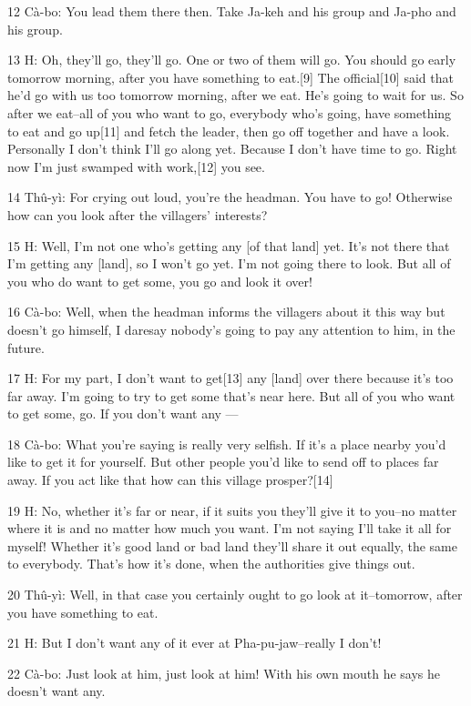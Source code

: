 {12 Cà-bo: You lead them there then. Take Ja-keh and his group and Ja-pho
and his group.}

{13 H: Oh, they'll go, they'll go. One or two of them will go. You should
go early tomorrow morning, after you have something to eat.[9] The official[10]
said that he'd go with us too tomorrow morning, after we eat. He's going to wait
for us. So after we eat--all of you who want to go, everybody who's going, have
something to eat and go up[11] and fetch the leader, then go off together and have
a look. Personally I don't think I'll go along yet. Because I don't have time to
go. Right now I'm just swamped with work,[12] you see.}

{14 Thû-yì: For crying out loud, you're the headman. You have to go! Otherwise
how can you look after the villagers' interests?}

{15 H: Well, I'm not one who's getting any [of that land] yet. It's not
there that I'm getting any [land], so I won't go yet. I'm not going there to look.
But all of you who do want to get some, you go and look it over! }

{16 Cà-bo: Well, when the headman informs the villagers about it this way
but doesn't go himself, I daresay nobody's going to pay any attention to him, in
the future. }

{17 H: For my part, I don't want to get[13] any [land] over there because
it's too far away. I'm going to try to get some that's near here. But all of you
who want to get some, go. If you don't want any ---}

{18 Cà-bo: What you're saying is really very selfish. If it's a place nearby
you'd like to get it for yourself. But other people you'd like to send off to places
far away. If you act like that how can this village prosper?[14]}

{19 H: No, whether it's far or near, if it suits you they'll give it to
you--no matter where it is and no matter how much you want. I'm not saying I'll
take it all for myself! Whether it's good land or bad land they'll share it out
equally, the same to everybody. That's how it's done, when the authorities give
things out. }

{20 Thû-yì: Well, in that case you certainly ought to go look at it--tomorrow,
after you have something to eat.}

{21 H: But I don't want any of it ever at Pha-pu-jaw--really I don't!}

{22 Cà-bo: Just look at him, just look at him! With his own mouth he says
he doesn't want any.}

